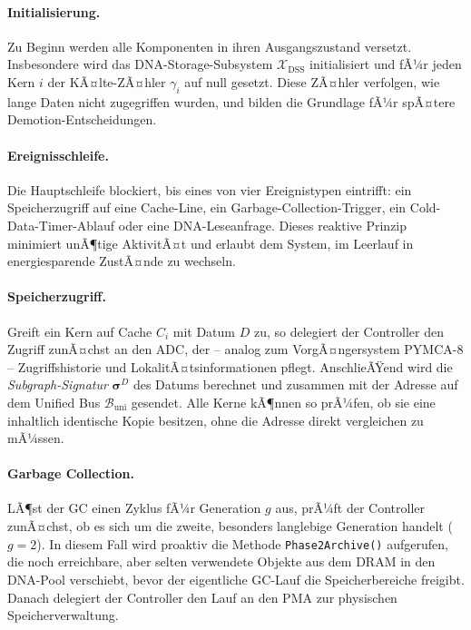 ﻿\documentclass[a4paper,12pt]{article}
\theoremstyle{definition}
\begin{document}
\paragraph{Initialisierung.}
Zu Beginn werden alle Komponenten in ihren Ausgangszustand versetzt. Insbesondere wird das DNA-Storage-Subsystem $\mathcal{X}_{\mathrm{DSS}}$ initialisiert und fÃ¼r jeden Kern $i$ der KÃ¤lte-ZÃ¤hler $\gamma_i$ auf null gesetzt. Diese ZÃ¤hler verfolgen, wie lange Daten nicht zugegriffen wurden, und bilden die Grundlage fÃ¼r spÃ¤tere Demotion-Entscheidungen.

\paragraph{Ereignisschleife.}
Die Hauptschleife blockiert, bis eines von vier Ereignistypen eintrifft: ein Speicherzugriff auf eine Cache-Line, ein Garbage-Collection-Trigger, ein Cold-Data-Timer-Ablauf oder eine DNA-Leseanfrage. Dieses reaktive Prinzip minimiert unÃ¶tige AktivitÃ¤t und erlaubt dem System, im Leerlauf in energiesparende ZustÃ¤nde zu wechseln.

\paragraph{Speicherzugriff.}
Greift ein Kern auf Cache $C_i$ mit Datum $D$ zu, so delegiert der Controller den Zugriff zunÃ¤chst an den ADC, der -- analog zum VorgÃ¤ngersystem PYMCA-8 -- Zugriffshistorie und LokalitÃ¤tsinformationen pflegt. AnschlieÃŸend wird die \emph{Subgraph-Signatur} $\boldsymbol{\sigma}^D$ des Datums berechnet und zusammen mit der Adresse auf dem Unified Bus $\mathcal{B}_{\mathrm{uni}}$ gesendet. Alle Kerne kÃ¶nnen so prÃ¼fen, ob sie eine inhaltlich identische Kopie besitzen, ohne die Adresse direkt vergleichen zu mÃ¼ssen.

\paragraph{Garbage Collection.}
LÃ¶st der GC einen Zyklus fÃ¼r Generation $g$ aus, prÃ¼ft der Controller zunÃ¤chst, ob es sich um die zweite, besonders langlebige Generation handelt ($g = 2$). In diesem Fall wird proaktiv die Methode \texttt{Phase2Archive()} aufgerufen, die noch erreichbare, aber selten verwendete Objekte aus dem DRAM in den DNA-Pool verschiebt, bevor der eigentliche GC-Lauf die Speicherbereiche freigibt. Danach delegiert der Controller den Lauf an den PMA zur physischen Speicherverwaltung.
\end{document}
